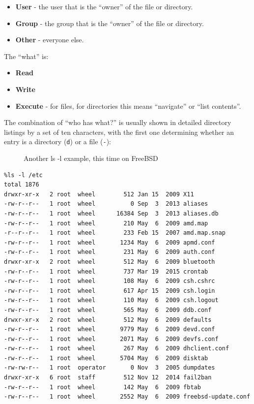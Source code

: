 \documentclass[10pt,]{book}
\numberwithin{figure}{chapter}
\DeclareRobustCommand{\drcap}[1]{\begin{figure}[H]\caption{#1}\end{figure}}
\begin{document}
\begin{itemize}
\item
  \textbf{User} - the user that is the ``owner'' of the file or
  directory.
\item
  \textbf{Group} - the group that is the ``owner'' of the file or
  directory.
\item
  \textbf{Other} - everyone else.
\end{itemize}

The ``what'' is:

\begin{itemize}
\item
  \textbf{Read}
\item
  \textbf{Write}
\item
  \textbf{Execute} - for files, for directories this means ``navigate''
  or ``list contents''.
\end{itemize}

The combination of ``who has what?'' is usually shown in detailed
directory listings by a set of ten characters, with the first one
determining whether an entry is a directory (\texttt{d}) or a file
(\texttt{-}):

\drcap{Another ls -l example, this time on FreeBSD}

\begin{verbatim}
%ls -l /etc
total 1876
drwxr-xr-x   2 root  wheel        512 Jan 15  2009 X11
-rw-r--r--   1 root  wheel          0 Sep  3  2013 aliases
-rw-r--r--   1 root  wheel      16384 Sep  3  2013 aliases.db
-rw-r--r--   1 root  wheel        210 May  6  2009 amd.map
-r--r--r--   1 root  wheel        233 Feb 15  2007 amd.map.snap
-rw-r--r--   1 root  wheel       1234 May  6  2009 apmd.conf
-rw-r--r--   1 root  wheel        231 May  6  2009 auth.conf
drwxr-xr-x   2 root  wheel        512 May  6  2009 bluetooth
-rw-r--r--   1 root  wheel        737 Mar 19  2015 crontab
-rw-r--r--   1 root  wheel        108 May  6  2009 csh.cshrc
-rw-r--r--   1 root  wheel        617 Apr 15  2009 csh.login
-rw-r--r--   1 root  wheel        110 May  6  2009 csh.logout
-rw-r--r--   1 root  wheel        565 May  6  2009 ddb.conf
drwxr-xr-x   2 root  wheel        512 May  6  2009 defaults
-rw-r--r--   1 root  wheel       9779 May  6  2009 devd.conf
-rw-r--r--   1 root  wheel       2071 May  6  2009 devfs.conf
-rw-r--r--   1 root  wheel        267 May  6  2009 dhclient.conf
-rw-r--r--   1 root  wheel       5704 May  6  2009 disktab
-rw-rw-r--   1 root  operator       0 Nov  3  2005 dumpdates
drwxr-xr-x   6 root  staff        512 Nov 12  2014 fail2ban
-rw-r--r--   1 root  wheel        142 May  6  2009 fbtab
-rw-r--r--   1 root  wheel       2552 May  6  2009 freebsd-update.conf
\end{verbatim}
\end{document}
